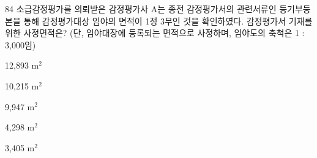 \begin{question}{84}
소급감정평가를 의뢰받은 감정평가사 A는 종전 감정평가서의 관련서류인 등기부등본을 통해 감정평가대상 임야의 면적이 1정 3무인 것을 확인하였다. 감정평가서 기재를 위한 사정면적은? (단, 임야대장에 등록되는 면적으로 사정하며, 임야도의 축척은 1 : 3,000임)
\begin{choices}
  \item 12,893 m$^{2}$
  \item 10,215 m$^{2}$
  \item 9,947 m$^{2}$
  \item 4,298 m$^{2}$
  \item 3,405 m$^{2}$
\end{choices}
\end{question}
